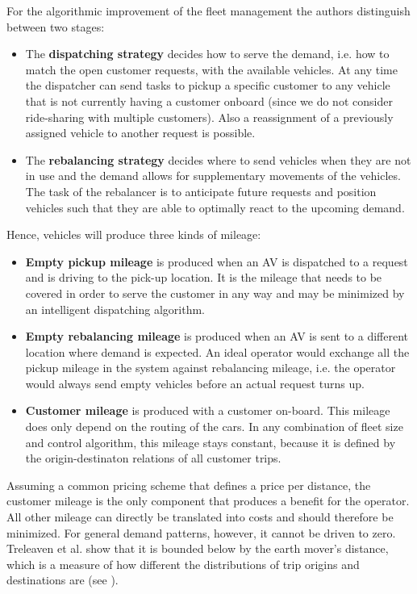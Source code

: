 For the algorithmic improvement of the fleet management the authors distinguish
between two stages:

\begin{itemize}
\item The \textbf{dispatching strategy} decides how to serve the demand, i.e.
how to match the open customer requests, with the available vehicles. At any time the dispatcher can send tasks to pickup a specific customer to any vehicle that is not currently having a customer onboard (since we do not consider ride-sharing with multiple customers). Also a reassignment of a previously assigned
vehicle to another request is possible.
\item The \textbf{rebalancing strategy} decides where to send vehicles when they
are not in use and the demand allows for supplementary movements of the vehicles.
The task of the rebalancer is to anticipate future requests and position vehicles
such that they are able to optimally react to the upcoming demand.
\end{itemize}

Hence, vehicles will produce three kinds of mileage:

\begin{itemize}
\item \textbf{Empty pickup mileage} is produced when an AV is dispatched
to a request and is driving to the pick-up location. It is the mileage that needs
to be covered in order to serve the customer in any way and may be minimized
by an intelligent dispatching algorithm.
\item \textbf{Empty rebalancing mileage} is produced when an AV is sent
to a different location where demand is expected. An ideal operator would
exchange all the pickup mileage in the system against rebalancing mileage, i.e. the operator would always send empty vehicles before an actual request turns up.
\item \textbf{Customer mileage} is produced with a customer on-board. This mileage does only depend on the routing of the cars. In any combination of fleet size and control algorithm, this mileage stays constant, because it is defined by the origin-destinaton relations of all customer trips.
\end{itemize}

Assuming a common pricing scheme that defines a price per distance, the customer mileage
is the only component that produces a benefit for the operator. All other mileage
can directly be translated into costs and should therefore be minimized. For general
demand patterns, however, it cannot be driven to zero. Treleaven et al. \cite{treleaven2011asymptotically}
show that it is bounded below by the earth mover's distance, which is a measure
of how different the distributions of trip origins and destinations are (see \cite{ruschendorf1985wasserstein}).

